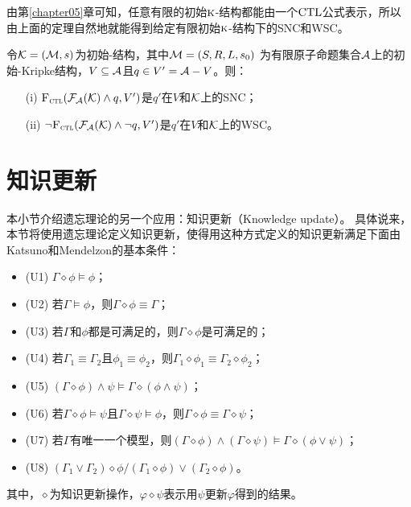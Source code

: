 由第\ref{chapter05}章可知，任意有限的初始$\textsc{k}$-结构都能由一个$\textrm{CTL}$公式表示，所以由上面的定理自然地就能得到给定有限初始$\textsc{k}$-结构下的SNC和WSC。
\begin{corollary}\label{thm:inK:SNC}
	令${\cal K}= ({\cal M}, s)$为初始\MPK-结构，其中${\cal M}=(S,R,L,s_0)$ 为有限原子命题集合${\cal A}$上的初始-Kripke结构，$V \subseteq {\cal A}$且$q\in V' = {\cal A} - V$。则：
	\begin{itemize}
		\item[(i)] ${\textsc{F}_{\textsc{ctl}}}({\cal F}_{{\cal A}}({\cal K}) \wedge q, V')$是$q'$在$V$和${\cal K}$上的SNC；
		\item[(ii)] $\neg {\textsc{F}_{\textsc{ctl}}}({\cal F}_{{\cal A}}({\cal K}) \wedge \neg q, V')$是$q'$在$V$和${\cal K}$上的WSC。
	\end{itemize}
\end{corollary}

\section{知识更新}\label{chapter07:sec:update}
本小节介绍遗忘理论的另一个应用：知识更新（Knowledge update）。
具体说来，本节将使用遗忘理论定义知识更新，使得用这种方式定义的知识更新满足下面由Katsuno和Mendelzon的基本条件：
\begin{itemize}
	\item (U1)  $\Gamma \diamond \phi \models \phi$；
	\item (U2) 若$\Gamma \models \phi$，则$\Gamma \diamond \phi \equiv \Gamma$；
	\item (U3) 若$\Gamma$和$\phi$都是可满足的，则$\Gamma \diamond \phi$是可满足的；
	\item (U4) 若$\Gamma_1\equiv \Gamma_2$且$\phi_1 \equiv \phi_2$，则$\Gamma_1 \diamond \phi_1 \equiv \Gamma_2 \diamond \phi_2$；
	\item (U5) $(\Gamma \diamond \phi) \wedge \psi \models \Gamma \diamond(\phi \wedge \psi)$；
	\item (U6) 若$\Gamma \diamond \phi \models \psi$且$\Gamma \diamond \psi \models \phi$，则$\Gamma \diamond \phi \equiv \Gamma \diamond \psi$；
	\item (U7) 若$\Gamma$有唯一一个模型，则$(\Gamma \diamond \phi) \wedge (\Gamma \diamond \psi) \models \Gamma \diamond (\phi \vee \psi)$；
	\item (U8) $(\Gamma_1 \vee \Gamma_2) \diamond \phi                                                                                                                    / (\Gamma_1 \diamond \phi) \vee  (\Gamma_2 \diamond \phi)$。
\end{itemize}
其中，$\diamond$为知识更新操作，$\varphi \diamond \psi$表示用$\psi$更新$\varphi$得到的结果。

